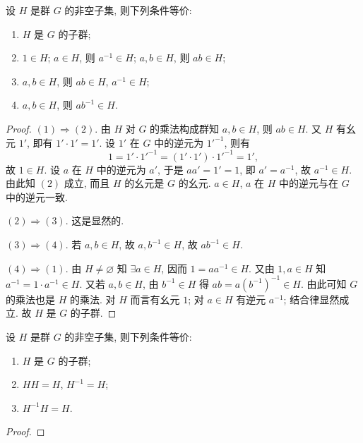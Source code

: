 \documentclass[../../main.tex]{subfiles}
\begin{document}
\begin{theorem}
设 \( H \) 是群 \( G \) 的非空子集, 则下列条件等价:
\begin{enumerate}[(1)]
\item \( H \) 是 \( G \) 的子群;

\item \( 1 \in H \); \( a \in H \), 则 \( a^{-1} \in H \); \( a, b \in H \), 则 \( ab \in H \);

\item \( a, b \in H \), 则 \( ab \in H \), \( a^{-1} \in H \);

\item \( a, b \in H \), 则 \( ab^{-1} \in H \).
\end{enumerate}
\end{theorem}
\begin{proof}
\( (1) \Rightarrow (2) \). 由 \( H \) 对 \( G \) 的乘法构成群知 \( a, b \in H \), 则 \( ab \in H \). 又 \( H \) 有幺元 \( 1' \), 即有 \( 1' \cdot 1' = 1' \). 设 \( 1' \) 在 \( G \) 中的逆元为 \( 1'^{-1} \), 则有
\[
1 = 1' \cdot 1'^{-1} = (1' \cdot 1') \cdot 1'^{-1} = 1',
\]
故 \( 1 \in H \). 设 \( a \) 在 \( H \) 中的逆元为 \( a' \), 于是 \( aa' = 1' = 1 \), 即 \( a' = a^{-1} \), 故 \( a^{-1} \in H \). 由此知 \( (2) \) 成立, 而且 \( H \) 的幺元是 \( G \) 的幺元. \( a \in H \), \( a \) 在 \( H \) 中的逆元与在 \( G \) 中的逆元一致.

\( (2) \Rightarrow (3) \). 这是显然的.

\( (3) \Rightarrow (4) \). 若 \( a, b \in H \), 故 \( a, b^{-1} \in H \), 故 \( ab^{-1} \in H \).

\( (4) \Rightarrow (1) \). 由 \( H \neq \varnothing \) 知 \( \exists a \in H \), 因而 \( 1 = aa^{-1} \in H \). 又由 \( 1, a \in H \) 知 \( a^{-1} = 1 \cdot a^{-1} \in H \). 又若 \( a, b \in H \), 由 \( b^{-1} \in H \) 得 \( ab = a(b^{-1})^{-1} \in H \). 由此可知 \( G \) 的乘法也是 \( H \) 的乘法. 对 \( H \) 而言有幺元 \( 1 \); 对 \( a \in H \) 有逆元 \( a^{-1} \); 结合律显然成立. 故 \( H \) 是 \( G \) 的子群.

\end{proof}

\begin{corollary}
设 \( H \) 是群 \( G \) 的非空子集, 则下列条件等价:
\begin{enumerate}[(1)]
\item \( H \) 是 \( G \) 的子群;

\item \( HH = H \), \( H^{-1} = H \);

\item \( H^{-1}H = H \).
\end{enumerate}
\end{corollary}
\begin{proof}


\end{proof}
\end{document}
